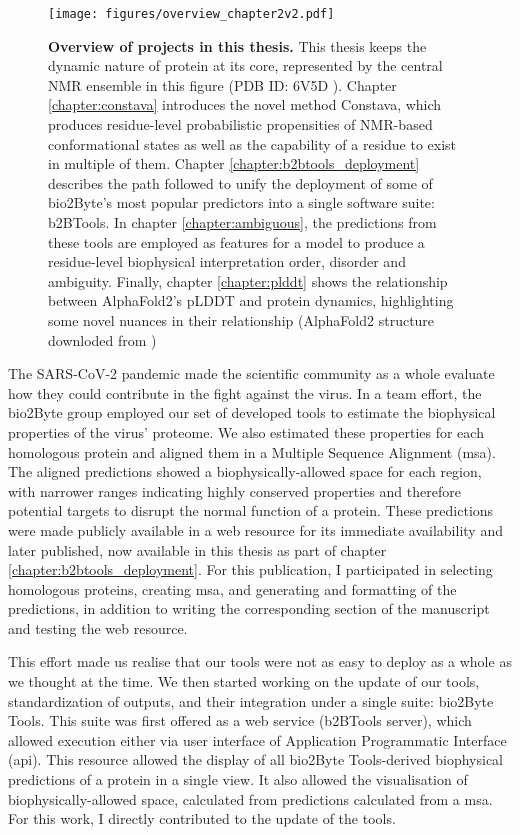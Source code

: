 \begin{figure}[tbh!]
    \centering
    \texttt{[image: figures/overview\_chapter2v2.pdf]}
    \caption{\textbf{Overview of projects in this thesis.}
    This thesis keeps the dynamic nature of protein at its core, represented by the central NMR ensemble in this figure (PDB ID: 6V5D \cite{smith_enhancing_2020}). Chapter \ref{chapter:constava} introduces the novel method Constava, which produces residue-level probabilistic propensities of NMR-based conformational states as well as the capability of a residue to exist in multiple of them. Chapter \ref{chapter:b2btools_deployment} describes the path followed to unify the deployment of some of bio2Byte's most popular predictors into a single software suite: b2BTools. In chapter \ref{chapter:ambiguous}, the predictions from these tools are employed as features for a model to produce a residue-level biophysical interpretation order, disorder and ambiguity. Finally, chapter \ref{chapter:plddt} shows the relationship between AlphaFold2's pLDDT and protein dynamics, highlighting some novel nuances in their relationship (AlphaFold2 structure downloded from ) 
    }
    \label{fig:chapter2:overview}
\end{figure}

The SARS-CoV-2 pandemic made the scientific community as a whole evaluate how they could contribute in the fight against the virus. In a team effort, the bio2Byte group employed our set of developed tools to estimate the biophysical properties of the virus' proteome. We also estimated these properties for each homologous protein and aligned them in a Multiple Sequence Alignment (\gls{msa}). The aligned predictions showed a biophysically-allowed space for each region, with narrower ranges indicating highly conserved properties and therefore potential targets to disrupt the normal function of a protein. These predictions were made publicly available in a web resource for its immediate availability and later published, now available in this thesis as part of chapter \ref{chapter:b2btools_deployment}. For this publication, I participated in selecting homologous proteins, creating \gls{msa}, and generating and formatting of the predictions, in addition to writing the corresponding section of the manuscript and testing the web resource.  

This effort made us realise that our tools were not as easy to deploy as a whole as we thought at the time. We then started working on the update of our tools, standardization of outputs, and their integration under a single suite: bio2Byte Tools. This suite was first offered as a web service (b2BTools server), which allowed execution either via user interface of Application Programmatic Interface (\gls{api}). This resource allowed the display of all bio2Byte Tools-derived biophysical predictions of a protein in a single view. It also allowed the visualisation of biophysically-allowed space, calculated from predictions calculated from a \gls{msa}. For this work, I directly contributed to the update of the tools.

